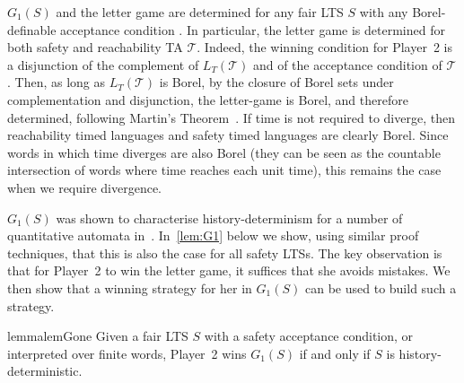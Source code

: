 \documentclass[10pt,a4paper]{amsart}
\theoremstyle{definition}
\numberwithin{equation}{section}
\newcommand{\T}{\mathcal{T}}
\newcommand{\lang}{L_T}  %
\newcommand{\lts}{S}
\begin{document}
\begin{remark}\label{determinacy} $G_1(\lts)$ and the letter game are determined for any fair LTS $\lts$ with any Borel-definable acceptance condition \cite{M1975}.
In particular, the letter game is determined for both safety and reachability TA $\T$. Indeed, the winning condition for Player~2 is a disjunction of the complement of $\lang(\T)$ and of the acceptance condition of $\T$. Then, as long as $\lang(\T)$ is Borel, by the closure of Borel sets under complementation and disjunction, the letter-game is Borel, and therefore determined, following Martin's Theorem~\cite{M1975}. If time is not required to diverge, then reachability timed languages and safety timed languages are clearly Borel. Since words in which time diverges are also Borel (they can be seen as the countable intersection of words where time reaches each unit time), this remains the case when we require divergence.
\end{remark}




$G_1(\lts)$ was shown to characterise history-determinism for a number of quantitative automata in~\cite{BL22}. In~\cref{lem:G1} below we show, using similar proof techniques, that this is also the case for all safety LTSs. The key observation is that for Player~2 to win the letter game, it suffices that she avoids mistakes. We then show that a winning strategy for her in $G_1(\lts)$ can be used to build such a strategy.

\begin{restatable}{lemma}{lemGone}\label{lem:G1}
Given a fair LTS $\lts$ with a safety acceptance condition, or interpreted over finite words, Player~2 wins $G_1(\lts)$ if and only if $\lts$ is history-deterministic.
\end{restatable}
\end{document}
